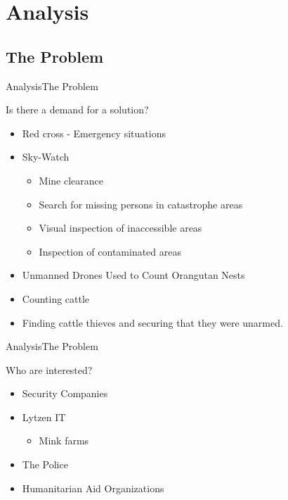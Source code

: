 \author{Bjarke Hesthaven Søndergaard}



\section{Analysis}
\subsection{The Problem}
\begin{frame}{Analysis}{The Problem}
    \begin{block}{Is there a demand for a solution?}
    \begin{itemize}
        \item Red cross - Emergency situations
        \item Sky-Watch
        \begin{itemize}
            \item Mine clearance
            \item Search for missing persons in catastrophe areas
            \item Visual inspection of inaccessible areas
            \item Inspection of contaminated areas
        \end{itemize}
        \item Unmanned Drones Used to Count Orangutan Nests
        \item Counting cattle
        \item Finding cattle thieves and securing that they were unarmed.
    \end{itemize}
    \end{block}
\end{frame}

\begin{frame}{Analysis}{The Problem}
    \begin{block}{Who are interested?}
    \begin{itemize}
        \item Security Companies
        \item Lytzen IT
        \begin{itemize}
            \item Mink farms
        \end{itemize}
        \item The Police
        \item Humanitarian Aid Organizations
    \end{itemize}
    \end{block}
\end{frame}

